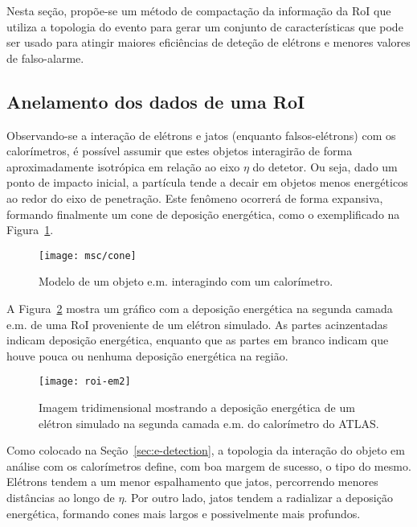 Nesta seção, propõe-se um método de compactação da informação da RoI que
utiliza a topologia do evento para gerar um conjunto de características que
pode ser usado para atingir maiores eficiências de deteção de elétrons e
menores valores de falso-alarme.

\subsection{Anelamento dos dados de uma RoI}

Observando-se a interação de elétrons e jatos (enquanto falsos-elétrons) com
os calorímetros, é possível assumir que estes objetos interagirão de forma
aproximadamente isotrópica em relação ao eixo $\eta$ do detetor. Ou seja, dado
um ponto de impacto inicial, a partícula tende a decair em objetos menos
energéticos ao redor do eixo de penetração. Este fenômeno ocorrerá de forma
expansiva, formando finalmente um cone de deposição energética, como o
exemplificado na Figura~\ref{fig:cone}.

\begin{figure}
\begin{center}
\texttt{[image: msc/cone]}
\end{center}
\caption{Modelo de um objeto e.m. interagindo com um calorímetro.}
\label{fig:cone}
\end{figure}

A Figura~\ref{fig:electron-roi} mostra um gráfico com a deposição energética na
segunda camada e.m. de uma RoI proveniente de um elétron simulado. As partes
acinzentadas indicam deposição energética, enquanto que as partes em branco
indicam que houve pouca ou nenhuma deposição energética na região.

\begin{figure}
\begin{center}
\texttt{[image: roi-em2]}
\end{center}
\caption{Imagem tridimensional mostrando a deposição energética de
um elétron simulado na segunda camada e.m. do calorímetro do ATLAS.}
\label{fig:electron-roi}
\end{figure}

Como colocado na Seção~\ref{sec:e-detection}, a topologia da interação do
objeto em análise com os calorímetros define, com boa margem de sucesso, o
tipo do mesmo. Elétrons tendem a um menor espalhamento que jatos, percorrendo
menores distâncias ao longo de $\eta$. Por outro lado, jatos tendem a
radializar a deposição energética, formando cones mais largos e possivelmente
mais profundos.

